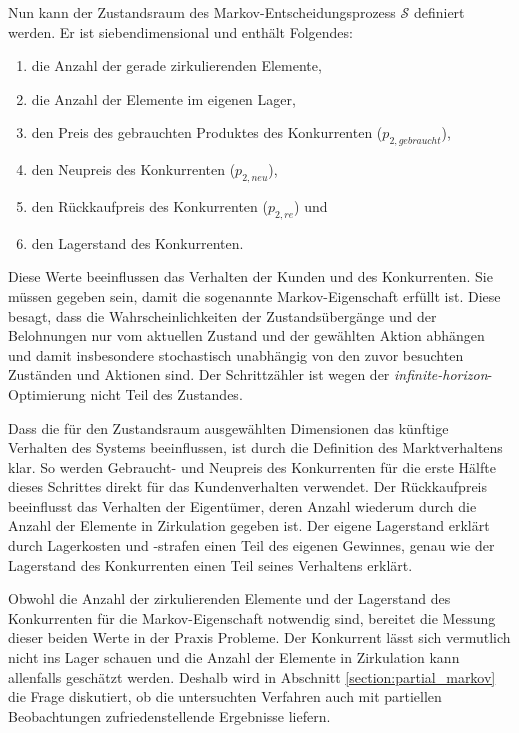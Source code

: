 Nun kann der Zustandsraum des Markov-Entscheidungsprozess $\mathcal{S}$ definiert werden.
Er ist siebendimensional und enthält Folgendes:
\begin{enumerate}
	\item die Anzahl der gerade zirkulierenden Elemente,
	\item die Anzahl der Elemente im eigenen Lager,
	\item den Preis des gebrauchten Produktes des Konkurrenten ($p_{2, gebraucht}$),
	\item den Neupreis des Konkurrenten ($p_{2, neu}$),
	\item den Rückkaufpreis des Konkurrenten ($p_{2, re}$) und
	\item den Lagerstand des Konkurrenten.
\end{enumerate}
Diese Werte beeinflussen das Verhalten der Kunden und des Konkurrenten.
Sie müssen gegeben sein, damit die sogenannte Markov-Eigenschaft erfüllt ist.
Diese besagt, dass die Wahrscheinlichkeiten der Zustandsübergänge und der Belohnungen nur vom aktuellen Zustand und der gewählten Aktion abhängen und damit insbesondere stochastisch unabhängig von den zuvor besuchten Zuständen und Aktionen sind.
Der Schrittzähler ist wegen der \textit{infinite-horizon}-Optimierung nicht Teil des Zustandes.

Dass die für den Zustandsraum ausgewählten Dimensionen das künftige Verhalten des Systems beeinflussen, ist durch die Definition des Marktverhaltens klar.
So werden Gebraucht- und Neupreis des Konkurrenten für die erste Hälfte dieses Schrittes direkt für das Kundenverhalten verwendet.
Der Rückkaufpreis beeinflusst das Verhalten der Eigentümer, deren Anzahl wiederum durch die Anzahl der Elemente in Zirkulation gegeben ist.
Der eigene Lagerstand erklärt durch Lagerkosten und -strafen einen Teil des eigenen Gewinnes, genau wie der Lagerstand des Konkurrenten einen Teil seines Verhaltens erklärt.

Obwohl die Anzahl der zirkulierenden Elemente und der Lagerstand des Konkurrenten für die Markov-Eigenschaft notwendig sind, bereitet die Messung dieser beiden Werte in der Praxis Probleme.
Der Konkurrent lässt sich vermutlich nicht ins Lager schauen und die Anzahl der Elemente in Zirkulation kann allenfalls geschätzt werden.
Deshalb wird in Abschnitt \ref{section:partial_markov} die Frage diskutiert, ob die untersuchten Verfahren auch mit partiellen Beobachtungen zufriedenstellende Ergebnisse liefern.

